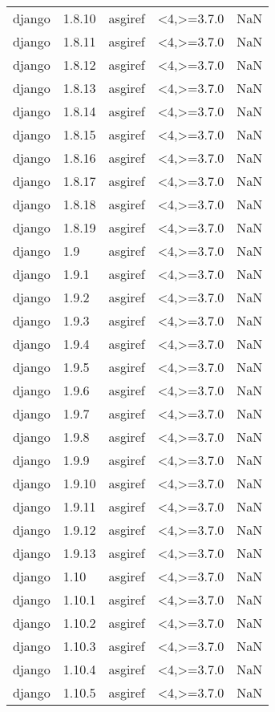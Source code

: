\begin{tabular}{llllr}
django & 1.8.10 & asgiref & <4,>=3.7.0 & NaN \\
django & 1.8.11 & asgiref & <4,>=3.7.0 & NaN \\
django & 1.8.12 & asgiref & <4,>=3.7.0 & NaN \\
django & 1.8.13 & asgiref & <4,>=3.7.0 & NaN \\
django & 1.8.14 & asgiref & <4,>=3.7.0 & NaN \\
django & 1.8.15 & asgiref & <4,>=3.7.0 & NaN \\
django & 1.8.16 & asgiref & <4,>=3.7.0 & NaN \\
django & 1.8.17 & asgiref & <4,>=3.7.0 & NaN \\
django & 1.8.18 & asgiref & <4,>=3.7.0 & NaN \\
django & 1.8.19 & asgiref & <4,>=3.7.0 & NaN \\
django & 1.9 & asgiref & <4,>=3.7.0 & NaN \\
django & 1.9.1 & asgiref & <4,>=3.7.0 & NaN \\
django & 1.9.2 & asgiref & <4,>=3.7.0 & NaN \\
django & 1.9.3 & asgiref & <4,>=3.7.0 & NaN \\
django & 1.9.4 & asgiref & <4,>=3.7.0 & NaN \\
django & 1.9.5 & asgiref & <4,>=3.7.0 & NaN \\
django & 1.9.6 & asgiref & <4,>=3.7.0 & NaN \\
django & 1.9.7 & asgiref & <4,>=3.7.0 & NaN \\
django & 1.9.8 & asgiref & <4,>=3.7.0 & NaN \\
django & 1.9.9 & asgiref & <4,>=3.7.0 & NaN \\
django & 1.9.10 & asgiref & <4,>=3.7.0 & NaN \\
django & 1.9.11 & asgiref & <4,>=3.7.0 & NaN \\
django & 1.9.12 & asgiref & <4,>=3.7.0 & NaN \\
django & 1.9.13 & asgiref & <4,>=3.7.0 & NaN \\
django & 1.10 & asgiref & <4,>=3.7.0 & NaN \\
django & 1.10.1 & asgiref & <4,>=3.7.0 & NaN \\
django & 1.10.2 & asgiref & <4,>=3.7.0 & NaN \\
django & 1.10.3 & asgiref & <4,>=3.7.0 & NaN \\
django & 1.10.4 & asgiref & <4,>=3.7.0 & NaN \\
django & 1.10.5 & asgiref & <4,>=3.7.0 & NaN \\

\end{tabular}
